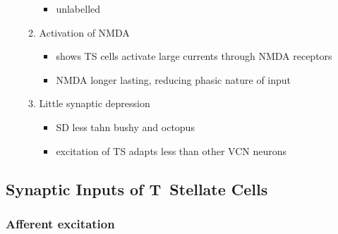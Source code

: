 \begin{enumerate}
\begin{enumerate}
\begin{itemize}
\item unlabelled \citep{RothmanManis:2003,RothmanManis:2003a,RothmanManis:2003b,Rothman:1999}
\end{itemize}
\item Activation of NMDA
\begin{itemize}
\item \citep{CaoOertel:2010} shows TS cells activate large currents through NMDA receptors
\item NMDA longer lasting, reducing phasic nature of input
\end{itemize}
\item Little synaptic depression
\begin{itemize}
\item SD less tahn bushy and octopus \citep{WuOertel:1987,ChandaXu-Friedman:2010,CaoOertel:2010}
\item excitation of TS adapts less than other VCN neurons
\end{itemize}
\end{enumerate}
\end{enumerate}



\subsection{Synaptic Inputs of T~Stellate Cells}\label{sec:synaptic-inputs-tstellate}


\subsubsection{Afferent excitation}

